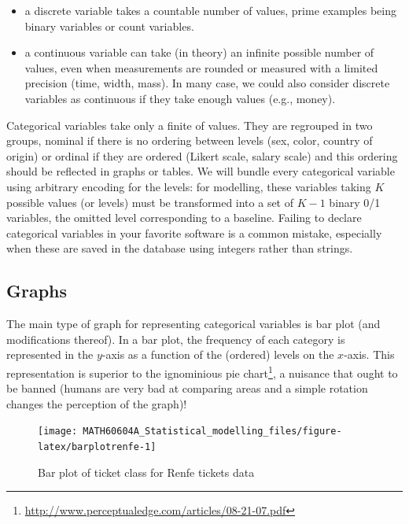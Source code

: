 \documentclass[
  11pt,
  letterpaper,
]{book}
\providecommand{\tightlist}{%
  \setlength{\itemsep}{0pt}\setlength{\parskip}{0pt}}
\renewcommand{\href}[2]{#2\footnote{\url{#1}}}
\theoremstyle{definition}
\theoremstyle{definition}
\theoremstyle{definition}
\theoremstyle{definition}
\theoremstyle{remark}
\begin{document}
\begin{itemize}
\tightlist
\item
  a discrete variable takes a countable number of values, prime examples being binary variables or count variables.
\item
  a continuous variable can take (in theory) an infinite possible number of values, even when measurements are rounded or measured with a limited precision (time, width, mass). In many case, we could also consider discrete variables as continuous if they take enough values (e.g., money).
\end{itemize}

Categorical variables take only a finite of values. They are regrouped in two groups, nominal if there is no ordering between levels (sex, color, country of origin) or ordinal if they are ordered (Likert scale, salary scale) and this ordering should be reflected in graphs or tables. We will bundle every categorical variable using arbitrary encoding for the levels: for modelling, these variables taking \(K\) possible values (or levels) must be transformed into a set of \(K-1\) binary 0/1 variables, the omitted level corresponding to a baseline. Failing to declare categorical variables in your favorite software is a common mistake, especially when these are saved in the database using integers rather than strings.

\hypertarget{graphs}{%
\subsection{Graphs}\label{graphs}}

The main type of graph for representing categorical variables is bar plot (and modifications thereof). In a bar plot, the frequency of each category is represented in the \(y\)-axis as a function of the (ordered) levels on the \(x\)-axis. This representation is superior to the \href{http://www.perceptualedge.com/articles/08-21-07.pdf}{ignominious pie chart}, a nuisance that ought to be banned (humans are very bad at comparing areas and a simple rotation changes the perception of the graph)!

\begin{figure}

{\centering \texttt{[image: MATH60604A\_Statistical\_modelling\_files/figure-latex/barplotrenfe-1]} 

}

\caption{Bar plot of ticket class for Renfe tickets data}\label{fig:barplotrenfe}
\end{figure}
\end{document}
